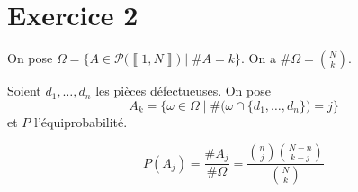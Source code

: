 \part{Exercice 2}

On pose $\Omega = \Big\{ A \in \mathcal{P}\big(\left\llbracket 1,N \right\rrbracket\big)  \mid  \#A = k\Big\} $. On a $\#\Omega = {N \choose k}$.

Soient $d_1, \ldots, d_n$ les pièces défectueuses. On pose \[
	A_k = \Big\{
		\omega \in \Omega  \mid \#\big(\omega \cap \{d_1, \ldots, d_n\}\big) = j
	\Big\}
\] et $P$ l'équiprobabilité.

\[
	P(A_j) = \frac{\#A_j}{\#\Omega} = \frac{{n \choose j} {N-n \choose k-j}}{{N \choose k}}
\]

